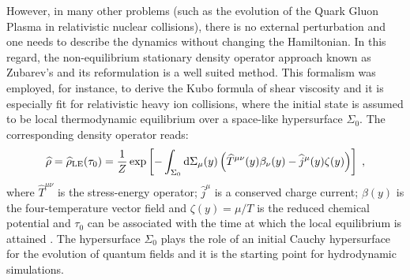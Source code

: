 \documentclass[prd,superscriptaddress,nofootinbib,notitlepage]{revtex4-1}
\def\wT{{\widehat T}}
\def\wj{{\widehat j}}
\def\wrho{{\widehat{\rho}}}
\newcommand{\di}{{\rm d}}
\begin{document}
However, in many other problems (such as the evolution of the Quark Gluon Plasma in relativistic nuclear collisions), there
is no external perturbation and one needs to describe the dynamics without changing the Hamiltonian. In this regard, the 
non-equilibrium stationary density operator approach known as Zubarev's \cite{Zub2} and its reformulation 
\cite{Becattini:2019dxo} is a well suited method. This formalism was employed, for instance, to derive the Kubo formula of shear viscosity 
\cite{Hosoya:1983id} and it is especially fit for relativistic heavy ion collisions, where the initial state is assumed
to be local thermodynamic equilibrium over a space-like hypersurface $\Sigma_0$. The corresponding density operator reads:
%
\begin{equation}\label{densop}
    \wrho=\wrho_{\rm LE}(\tau_0)=\frac{1}{Z}\exp\left[-\int_{\Sigma_{0}}\di\Sigma_\mu(y)
    \left(\wT^{\mu\nu}(y) \beta_\nu(y)-\wj^\mu(y)\zeta(y)\right)\right]\;,
\end{equation}
%
where $\wT^{\mu\nu}$ is the stress-energy operator; $\wj^\mu$ is a conserved charge current; $\beta(y)$ is the four-temperature 
vector field and $\zeta(y) = \mu/T$ is the reduced chemical potential and $\tau_0$ can be associated with the time at which the local equilibrium is attained \cite{Becattini:2019dxo}. The hypersurface $\Sigma_0$ plays the role of an initial 
Cauchy hypersurface for the evolution of quantum fields and it is the starting point for hydrodynamic simulations. 
\end{document}
